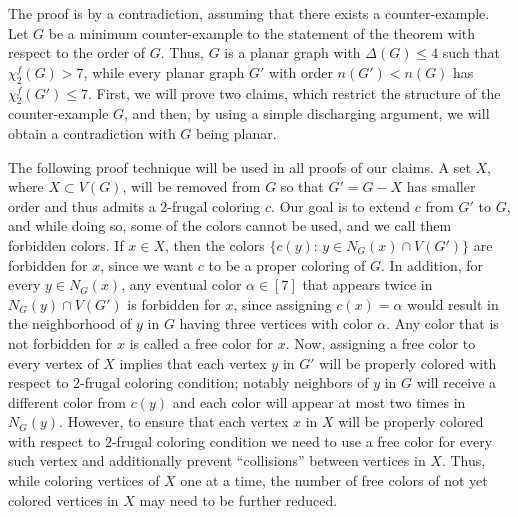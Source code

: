 \documentclass[11pt]{article}
\newcommand{\fd}{\chi_{2}^{f}}
\begin{document}
The proof is by a contradiction, assuming that there exists a counter-example. Let $G$ be a minimum counter-example to the statement of the theorem with respect to the order of $G$. Thus, $G$ is a planar graph with $\Delta(G)\le 4$ such that $\fd(G)>7$, while every planar graph $G'$ with order $n(G')<n(G)$ has $\fd(G')\le 7$. First, we will prove two claims, which restrict the structure of the counter-example $G$, and then, by using a simple discharging argument, we will obtain a contradiction with $G$ being planar.

The following proof technique will be used in all proofs of our claims.
A set $X$, where $X\subset V(G)$, will be removed from $G$ so that $G'=G-X$ has smaller order and thus admits a $2$-frugal coloring $c$. Our goal is to extend $c$ from $G'$ to $G$, and while doing so, some of the colors cannot be used, and we call them forbidden colors. If $x\in X$, then the colors $\{c(y):\, y\in N_G(x)\cap V(G')\}$ are forbidden for $x$, since we want $c$ to be a proper coloring of $G$. In addition, for every $y\in N_G(x)$, any eventual color $\alpha\in [7]$ that appears twice in $N_G(y)\cap V(G')$ is forbidden for $x$, since assigning $c(x)=\alpha$ would result in the neighborhood of $y$ in $G$ having three vertices with color $\alpha$. Any color that is not forbidden for $x$ is called a free color for $x$. Now, assigning a free color to every vertex of $X$ implies that each vertex $y$ in $G'$ will be properly colored with respect to $2$-frugal coloring condition; notably neighbors of $y$ in $G$ will receive a different color from $c(y)$ and each color will appear at most two times in $N_G(y)$. However, to ensure that each vertex $x$ in $X$ will be properly colored with respect to $2$-frugal coloring condition we need to use a free color for every such vertex and additionally prevent ``collisions'' between vertices in $X$. Thus, while coloring vertices of $X$ one at a time, the number of free colors of not yet colored vertices in $X$ may need to be further reduced. 
\end{document}
